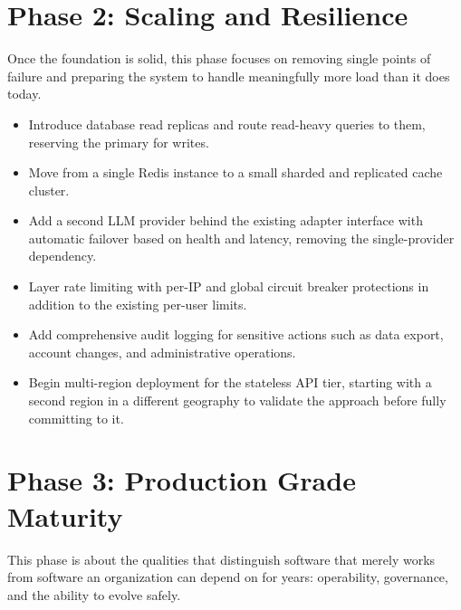 \documentclass[11pt,a4paper]{report}
\begin{document}
\section{Phase 2: Scaling and Resilience}

Once the foundation is solid, this phase focuses on removing single points of failure and preparing the system to handle meaningfully more load than it does today.

\begin{itemize}[leftmargin=*]
\item Introduce database read replicas and route read-heavy queries to them, reserving the primary for writes.
\item Move from a single Redis instance to a small sharded and replicated cache cluster.
\item Add a second LLM provider behind the existing adapter interface with automatic failover based on health and latency, removing the single-provider dependency.
\item Layer rate limiting with per-IP and global circuit breaker protections in addition to the existing per-user limits.
\item Add comprehensive audit logging for sensitive actions such as data export, account changes, and administrative operations.
\item Begin multi-region deployment for the stateless API tier, starting with a second region in a different geography to validate the approach before fully committing to it.
\end{itemize}

\section{Phase 3: Production Grade Maturity}

This phase is about the qualities that distinguish software that merely works from software an organization can depend on for years: operability, governance, and the ability to evolve safely.
\end{document}
